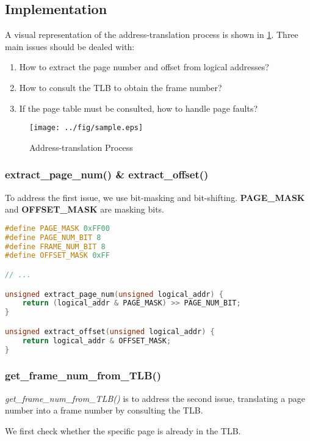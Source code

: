 \documentclass{article}
\begin{document}
\subsection*{Implementation}
A visual representation of the address-translation process is shown in \ref{sample}. Three main issues should be dealed with: 
\begin{enumerate}
    \item How to extract the page number and offset from logical addresses?
    \item How to consult the TLB to obtain the frame number?
    \item If the page table must be consulted, how to handle page faults? 
\end{enumerate}

\begin{figure}[h]
    \centering
    
    \texttt{[image: ../fig/sample.eps]}
    \caption{Address-translation Process}
    \label{sample}
\end{figure}

\subsubsection*{extract\_page\_num() \& extract\_offset()}
To address the first issue, we use bit-masking and bit-shifting. \textbf{PAGE\_MASK} and \textbf{OFFSET\_MASK} are masking bits.

\begin{lstlisting}[language=c, caption={extract\_page\_num() \& extract\_offset()}]
#define PAGE_MASK 0xFF00
#define PAGE_NUM_BIT 8
#define FRAME_NUM_BIT 8
#define OFFSET_MASK 0xFF

// ...

unsigned extract_page_num(unsigned logical_addr) {
    return (logical_addr & PAGE_MASK) >> PAGE_NUM_BIT; 
}

unsigned extract_offset(unsigned logical_addr) {
    return logical_addr & OFFSET_MASK;
}
\end{lstlisting}

\subsubsection{get\_frame\_num\_from\_TLB()}
\textit{get\_frame\_num\_from\_TLB()} is to address the second issue, translating a page number into a frame number by consulting the TLB. 

We first check whether the specific page is already in the TLB. 
\end{document}
